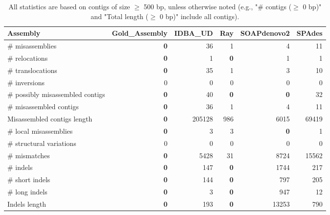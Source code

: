 \documentclass[12pt,a4paper]{article}
\begin{document}
\begin{table}[ht]
\begin{center}
\caption{All statistics are based on contigs of size $\geq$ 500 bp, unless otherwise noted (e.g., "\# contigs ($\geq$ 0 bp)" and "Total length ($\geq$ 0 bp)" include all contigs).}
\begin{tabular}{|l*{5}{|r}|}
\hline
Assembly & Gold\_Assembly & IDBA\_UD & Ray & SOAPdenovo2 & SPAdes \\ \hline
\# misassemblies & {\bf 0} & 36 & 1 & 4 & 11 \\ \hline
\hspace{5mm}\# relocations & {\bf 0} & 1 & {\bf 0} & 1 & 1 \\ \hline
\hspace{5mm}\# translocations & {\bf 0} & 35 & 1 & 3 & 10 \\ \hline
\hspace{5mm}\# inversions & 0 & 0 & 0 & 0 & 0 \\ \hline
\# possibly misassembled contigs & {\bf 0} & 40 & {\bf 0} & {\bf 0} & 32 \\ \hline
\# misassembled contigs & {\bf 0} & 36 & 1 & 4 & 11 \\ \hline
Misassembled contigs length & {\bf 0} & 205128 & 986 & 6015 & 69419 \\ \hline
\# local misassemblies & {\bf 0} & 3 & 3 & {\bf 0} & 1 \\ \hline
\# structural variations & 0 & 0 & 0 & 0 & 0 \\ \hline
\# mismatches & {\bf 0} & 5428 & 31 & 8724 & 15562 \\ \hline
\# indels & {\bf 0} & 147 & {\bf 0} & 1744 & 217 \\ \hline
\hspace{5mm}\# short indels & {\bf 0} & 144 & {\bf 0} & 797 & 205 \\ \hline
\hspace{5mm}\# long indels & {\bf 0} & 3 & {\bf 0} & 947 & 12 \\ \hline
Indels length & {\bf 0} & 193 & {\bf 0} & 13253 & 790 \\ \hline
\end{tabular}
\end{center}
\end{table}
\end{document}
